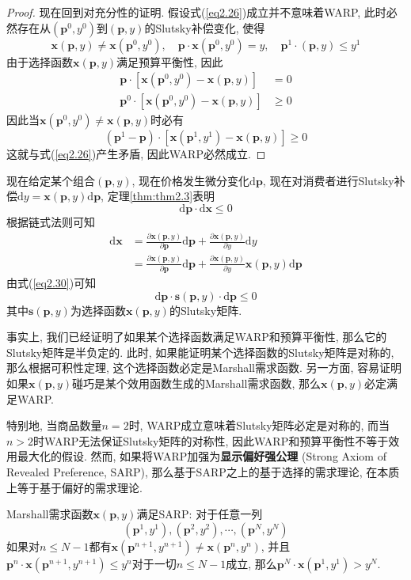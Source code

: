 \documentclass[cn, 12pt, math=mtpro2, bibstyle=apa, blue]{elegantbook}
\newcommand{\p}{\mathbf{p}}
\newcommand{\x}{\mathbf{x}}
\begin{document}
\begin{proof}
  现在回到对充分性的证明. 假设式(\ref{eq2.26})成立并不意味着WARP, 此时必然存在从$(\p^0,y^0)$到$(\p,y)$的Slutsky补偿变化, 使得
  $$\x(\p,y)\neq \x(\p^0,y^0),\quad \p\cdot\x(\p^0,y^0)=y,\quad \p^1\cdot(\p,y)\leq y^1$$
  由于选择函数$\x(\p,y)$满足预算平衡性, 因此
  \begin{align*}
  \p\cdot[\x(\p^0,y^0)-\x(\p,y)]&=0 \\
  \p^0\cdot [\x(\p^0,y^0)-\x(\p,y)]&\ge0
  \end{align*}
  因此当$\x(\p^0,y^0)\neq \x(\p,y)$时必有
  $$(\p^1-\p)\cdot [\x(\p^1,y^1)-\x(\p,y)]\geq 0$$
  这就与式(\ref{eq2.26})产生矛盾, 因此WARP必然成立.
  \end{proof}
现在给定某个组合$(\p,y)$, 现在价格发生微分变化$\text{d}\p$, 现在对消费者进行Slutsky补偿$\text{d}y=\x(\p,y)\text{d}\p$, 定理\ref{thm:thm2.3}表明
\begin{equation}\label{eq2.30}
  \text{d}\p\cdot\text{d}\x\leq0
\end{equation}
根据链式法则可知
\begin{align*}
\text{d}\x&=\frac{\partial \x(\p,y)}{\partial\p}\text{d}\p+\frac{\partial \x(\p,y)}{\partial y}\text{d}y \\
&=\frac{\partial \x(\p,y)}{\partial\p}\text{d}\p+\frac{\partial \x(\p,y)}{\partial y}\x(\p,y)\text{d}\p
\end{align*}
由式(\ref{eq2.30})可知
$$\text{d}\p\cdot \mathbf{s}(\p,y)\cdot \text{d}\p\leq 0$$
其中$\mathbf{s}(\p,y)$为选择函数$\x(\p,y)$的Slutsky矩阵.

事实上, 我们已经证明了如果某个选择函数满足WARP和预算平衡性, 那么它的Slutsky矩阵是半负定的. 此时, 如果能证明某个选择函数的Slutsky矩阵是对称的, 那么根据可积性定理, 这个选择函数必定是Marshall需求函数. 另一方面, 容易证明如果$\x(\p,y)$碰巧是某个效用函数生成的Marshall需求函数, 那么$\x(\p,y)$必定满足WARP.

特别地, 当商品数量$n=2$时, WARP成立意味着Slutsky矩阵必定是对称的, 而当$n>2$时WARP无法保证Slutsky矩阵的对称性, 因此WARP和预算平衡性不等于效用最大化的假设. 然而, 如果将WARP加强为\textbf{显示偏好强公理} (Strong Axiom of Revealed Preference, SARP), 那么基于SARP之上的基于选择的需求理论, 在本质上等于基于偏好的需求理论.

\begin{definition}[显示偏好强公理]
Marshall需求函数$\x(\p,y)$满足SARP: 对于任意一列
$$(\p^1,y^1),(\p^2,y^2),\cdots,(\p^N,y^N)$$
如果对$n\le N-1$都有$\x(\p^{n+1},y^{n+1})\neq \x(\p^n,y^n)$, 并且$\p^n\cdot\x(\p^{n+1},y^{n+1})\leq y^n$对于一切$n\leq N-1$成立, 那么$\p^N\cdot\x(\p^1,y^1)>y^N$.
\end{definition}
\end{document}
